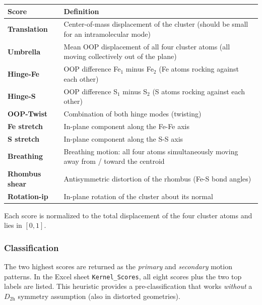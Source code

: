 \documentclass[11pt,a4paper,twoside]{article}
\theoremstyle{remark}
\begin{document}
\begin{center}
\begin{tabularx}{\textwidth}{l X}
\toprule
\textbf{Score} & \textbf{Definition} \\
\midrule
\textbf{Translation}    & Center-of-mass displacement of the cluster
                          (should be small for an intramolecular mode) \\
\textbf{Umbrella}       & Mean OOP displacement of all four cluster atoms
                          (all moving collectively out of the plane) \\
\textbf{Hinge-Fe}       & OOP difference Fe$_1$ minus Fe$_2$
                          (Fe atoms rocking against each other) \\
\textbf{Hinge-S}        & OOP difference S$_1$ minus S$_2$
                          (S atoms rocking against each other) \\
\textbf{OOP-Twist}      & Combination of both hinge modes (twisting) \\
\textbf{Fe stretch}     & In-plane component along the Fe-Fe axis \\
\textbf{S stretch}      & In-plane component along the S-S axis \\
\textbf{Breathing}      & Breathing motion: all four atoms simultaneously
                          moving away from / toward the centroid \\
\textbf{Rhombus shear}  & Antisymmetric distortion of the rhombus
                          (Fe-S bond angles) \\
\textbf{Rotation-ip}    & In-plane rotation of the cluster about its normal \\
\bottomrule
\end{tabularx}
\end{center}

Each score is normalized to the total displacement of the four
cluster atoms and lies in $[0, 1]$.

\subsubsection*{Classification}

The two highest scores are returned as the \emph{primary} and
\emph{secondary} motion patterns. In the Excel sheet
\texttt{Kernel\_Scores}, all eight scores plus the two top labels
are listed. This heuristic provides a pre-classification that works
\textit{without} a $D_\mathrm{2h}$ symmetry assumption (also in
distorted geometries).
\end{document}
